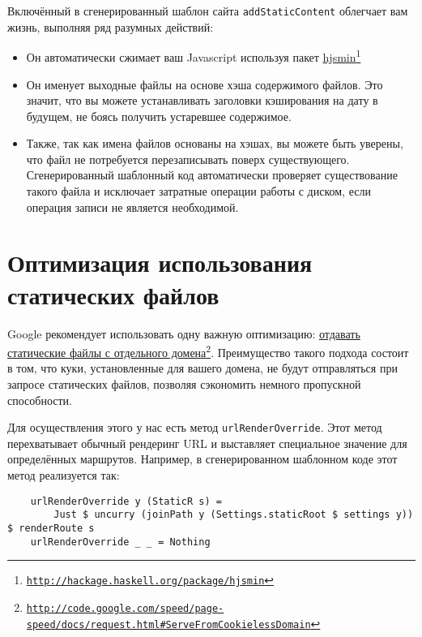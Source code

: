 Включённый в сгенерированный шаблон сайта \lstinline!addStaticContent! облегчает вам жизнь, выполняя ряд разумных действий:
\begin{itemize}
  \item Он автоматически сжимает ваш Javascript используя пакет \href{http://hackage.haskell.org/package/hjsmin}{hjsmin}\footnote{\href{http://hackage.haskell.org/package/hjsmin}{\texttt{http://hackage.haskell.org/package/hjsmin}}}
  \item Он именует выходные файлы на основе хэша содержимого файлов. Это значит, что вы можете устанавливать заголовки кэширования на дату в будущем, не боясь получить устаревшее содержимое.
  \item Также, так как имена файлов основаны на хэшах, вы можете быть уверены, что файл не потребуется перезаписывать поверх существующего. Сгенерированный шаблонный код автоматически проверяет существование такого файла и исключает затратные операции работы с диском, если операция записи не является необходимой.
\end{itemize}

\section {Оптимизация использования статических файлов}

Google рекомендует использовать одну важную оптимизацию: \href{http://code.google.com/speed/page-speed/docs/request.html\#ServeFromCookielessDomain}{отдавать статические файлы с отдельного домена}\footnote{\href{http://code.google.com/speed/page-speed/docs/request.html\#ServeFromCookielessDomain}{\texttt{http://code.google.com/speed/page-speed/docs/request.html\#ServeFromCookielessDomain}}}. Преимущество такого подхода состоит в том, что куки, установленные для вашего домена, не будут отправляться при запросе статических файлов, позволяя сэкономить немного пропускной способности.

Для осуществления этого у нас есть метод \lstinline!urlRenderOverride!. Этот метод перехватывает обычный рендеринг URL и выставляет специальное значение для определённых маршрутов. Например, в сгенерированном шаблонном коде этот метод реализуется так:

\begin{lstlisting}
    urlRenderOverride y (StaticR s) =
        Just $ uncurry (joinPath y (Settings.staticRoot $ settings y)) $ renderRoute s
    urlRenderOverride _ _ = Nothing
\end{lstlisting}%

